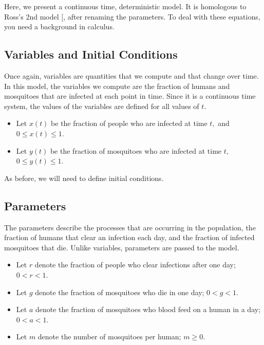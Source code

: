 \documentclass[
]{book}
\begin{document}
Here, we present a continuous time, deterministic model. It is homologous to Ross's 2nd model {[}\citeproc{ref-RossR1911Nature}{28}{]}, after renaming the parameters. To deal with these equations, you need a background in calculus.

\subsection{Variables and Initial Conditions}\label{variables-and-initial-conditions}

Once again, variables are quantities that we compute and that change over time. In this model, the variables we compute are the fraction of humans and mosquitoes that are infected at each point in time. Since it is a continuous time system, the values of the variables are defined for all values of \(t.\)

\begin{itemize}
\item
  Let \(x(t)\) be the fraction of people who are infected at time \(t,\) and \(0 \leq x(t) \leq 1.\)
\item
  Let \(y(t)\) be the fraction of mosquitoes who are infected at time \(t,\) \(0 \leq y(t) \leq 1.\)
\end{itemize}

As before, we will need to define initial conditions.

\subsection{Parameters}\label{parameters-1}

The parameters describe the processes that are occurring in the population, the fraction of humans that clear an infection each day, and the fraction of infected mosquitoes that die. Unlike variables, parameters are passed to the model.

\begin{itemize}
\item
  Let \(r\) denote the fraction of people who clear infections after one day; \(0 < r < 1.\)
\item
  Let \(g\) denote the fraction of mosquitoes who die in one day; \(0 < g < 1.\)
\item
  Let \(a\) denote the fraction of mosquitoes who blood feed on a human in a day; \(0 < a < 1.\)
\item
  Let \(m\) denote the number of mosquitoes per human; \(m \geq 0.\)
\end{itemize}
\end{document}
